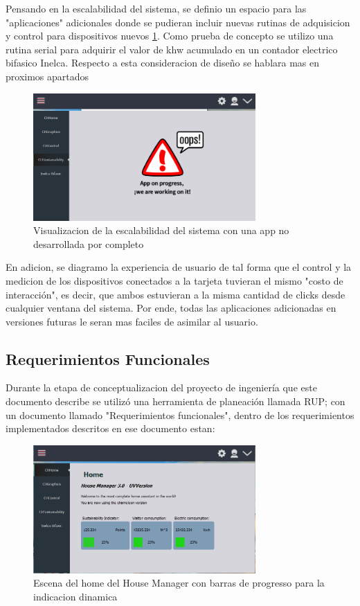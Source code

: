 Pensando en la escalabilidad del sistema, se definio un espacio para las "aplicaciones" adicionales donde se pudieran incluir nuevas rutinas de adquisicion y control para dispositivos nuevos \ref{fig_6}. Como prueba de concepto se utilizo una rutina serial para adquirir el valor de khw acumulado en un contador electrico bifasico Inelca. Respecto a esta consideracion de diseño se hablara mas en proximos apartados

\begin{figure}[htbp]
	\centerline{\includegraphics[width=8.5cm]{figuras/housemanager_newapp.png}}
	\caption{Visualizacion de la escalabilidad del sistema con una app no desarrollada por completo}
	\label{fig_6}
\end{figure}

En adicion, se diagramo la experiencia de usuario de tal forma que el control y la medicion de los dispositivos conectados a la tarjeta tuvieran el mismo "costo de interacción", es decir, que ambos estuvieran a la misma cantidad de clicks desde cualquier ventana del sistema. Por ende, todas las aplicaciones adicionadas en versiones futuras le seran mas faciles de asimilar al usuario.

\subsection{Requerimientos Funcionales}

Durante la etapa de conceptualizacion del proyecto de ingeniería que este documento describe se utilizó una herramienta de planeación llamada RUP; con un documento llamado "Requerimientos funcionales", dentro de los requerimientos implementados descritos en ese documento estan: 

\begin{figure}[htbp]
	\centerline{\includegraphics[width=8.5cm]{figuras/housemanager_home.png}}
	\caption{Escena del home del House Manager con barras de progresso para la indicacion dinamica}
	\label{fig_7}
\end{figure}

